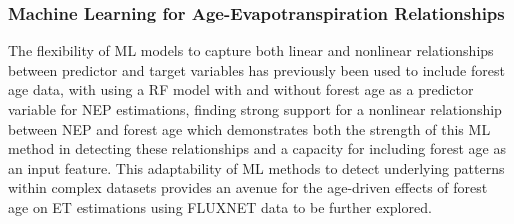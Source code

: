 \subsubsection{Machine Learning for Age-Evapotranspiration Relationships}
The flexibility of ML models to capture both linear and nonlinear relationships between predictor and target variables has previously been used to include forest age data, with \textcite{besnard2018} using a RF model with and without forest age as a predictor variable for \ac{NEP} estimations, finding strong support for a nonlinear relationship between NEP and forest age which demonstrates both the strength of this ML method in detecting these relationships and a capacity for including forest age as an input feature. This adaptability of ML methods to detect underlying patterns within complex datasets provides an avenue for the age-driven effects of forest age on ET estimations using FLUXNET data to be further explored. 

